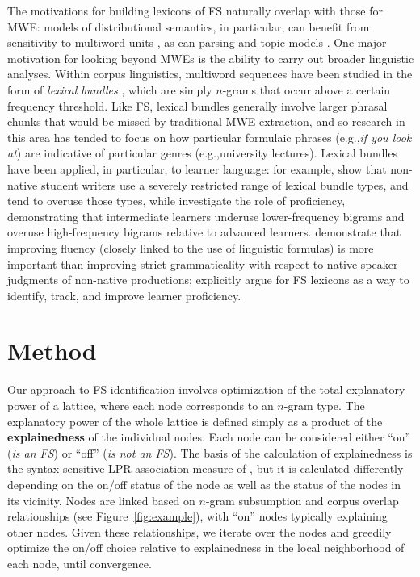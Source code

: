 \documentclass[11pt,letterpaper]{article}
\makeatletter
\def \eg {e.g.,\@ }
\newcommand{\termdef}[1]{\textbf{#1}\xspace}
\newcommand{\figref}[2][]{Figure#1~\ref{#2}\xspace}
\makeatother
\begin{document}
The motivations for building lexicons of FS naturally overlap with those for MWE: models of distributional semantics, in particular, can benefit from sensitivity to multiword units \cite{Cohen:Widdows:2009}, as can parsing \cite{Constant16} and topic models \cite{Lau+:2012b}. One major motivation for looking beyond MWEs is the ability to carry out broader linguistic analyses. Within corpus linguistics, multiword sequences have been studied in the form of \textit{lexical bundles} \cite{Biber04}, which are simply $n$-grams that occur above a certain frequency threshold. Like FS, lexical bundles generally involve larger phrasal chunks that would be missed by traditional MWE extraction, and so research in this area has tended to focus on how particular formulaic phrases (\eg \textit{if you look at}) are indicative of particular genres (\eg university lectures). Lexical bundles have been applied, in particular, to learner language: for example,   show that non-native student writers use a severely restricted range of lexical bundle types, and tend to overuse those types, while  investigate the role of proficiency, demonstrating that intermediate learners underuse lower-frequency bigrams and overuse high-frequency bigrams relative to advanced learners.  demonstrate that improving fluency (closely linked to the use of linguistic formulas) is more important than improving strict grammaticality with respect to native speaker judgments of non-native productions;  explicitly argue for FS lexicons as a way to identify, track, and improve learner proficiency.


\section{Method}

Our approach to FS identification involves optimization of the total explanatory power of a lattice, where each node corresponds to an $n$-gram type. The explanatory power of the whole lattice is defined simply as a product of the \termdef{explainedness} of the individual nodes. Each node can be considered either ``on'' (\textit{is an FS}) or ``off'' (\textit{is not an FS}). The basis of the calculation of explainedness is the syntax-sensitive LPR association measure of , but it is calculated differently depending on the on/off status of the node as well as the status of the nodes in its vicinity. Nodes are linked based on $n$-gram subsumption and corpus overlap relationships (see \figref{fig:example}), with ``on'' nodes typically explaining other nodes.  Given these relationships, we iterate over the nodes and greedily optimize the on/off choice relative to explainedness in the local neighborhood of each node, until convergence.
\end{document}
